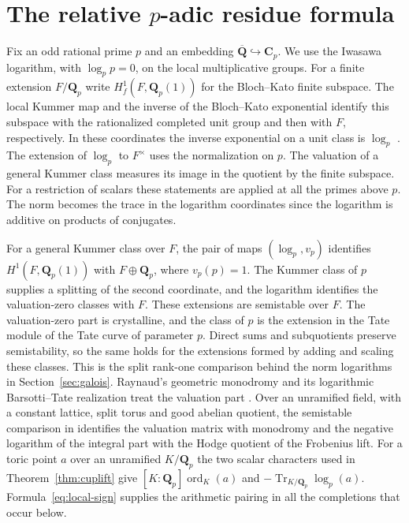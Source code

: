 \documentclass[11pt]{amsart}
\numberwithin{equation}{section}
\theoremstyle{definition}
\theoremstyle{remark}
\newcommand{\Q}{\mathbf Q}
\newcommand{\Qbar}{\overline{\mathbf Q}}
\newcommand{\Cp}{\mathbf C_p}
\newcommand{\Tr}{\operatorname{Tr}}
\newcommand{\ord}{\operatorname{ord}}
\begin{document}
\section{The relative \texorpdfstring{$p$}{p}-adic residue formula}
\label{sec:padicrelative}

Fix an odd rational prime $p$ and an embedding $\Qbar\hookrightarrow
\Cp$. We use the Iwasawa logarithm, with $\log_p p=0$, on
the local multiplicative groups. For a finite extension $F/\Q_p$
write $H_f^1(F,\Q_p(1))$ for the Bloch--Kato finite subspace.
The local Kummer map and the inverse of the Bloch--Kato
exponential identify this subspace with the rationalized
completed unit group and then with $F$, respectively. In
these coordinates the inverse exponential on a unit class is
$\log_p$ \cite[\S3]{BlochKato}. The extension of $\log_p$ to
$F^\times$ uses the normalization on $p$. The valuation of
a general Kummer class measures its image in the quotient
by the finite subspace. For a restriction of scalars these
statements are applied at all the primes above $p$. The norm
becomes the trace in the logarithm coordinates since the
logarithm is additive on products of conjugates.

For a general Kummer class over $F$, the pair of maps
$(\log_p,v_p)$ identifies $H^1(F,\Q_p(1))$ with
$F\oplus\Q_p$, where $v_p(p)=1$. The Kummer class of
$p$ supplies a splitting of the second coordinate, and
the logarithm identifies the valuation-zero classes with
$F$. These extensions are semistable over $F$. The
valuation-zero part is crystalline, and the class of
$p$ is the extension in the Tate module of the Tate
curve of parameter $p$. Direct sums and subquotients
preserve semistability, so the same holds for the
extensions formed by adding and scaling these
classes. This is the split rank-one comparison behind
the norm logarithms in Section~\ref{sec:galois}.
Raynaud's geometric monodromy and its logarithmic Barsotti--Tate
realization treat the valuation part
\cite{Raynaud,BertapelleEtAl}. Over an unramified field, with a
constant lattice, split torus and good abelian quotient, the
semistable comparison in \cite[Thms.~3.4, 5.1]{MohajerSemistable}
identifies the valuation matrix with monodromy and the negative
logarithm of the integral part with the Hodge quotient of the
Frobenius lift. For a toric point $a$ over an unramified $K/\Q_p$
the two scalar characters used in Theorem~\ref{thm:cuplift} give
$[K:\Q_p]\ord_K(a)$ and $-\Tr_{K/\Q_p}\log_p(a)$.
Formula~\eqref{eq:local-sign} supplies the arithmetic pairing in
all the completions that occur below.
\end{document}
